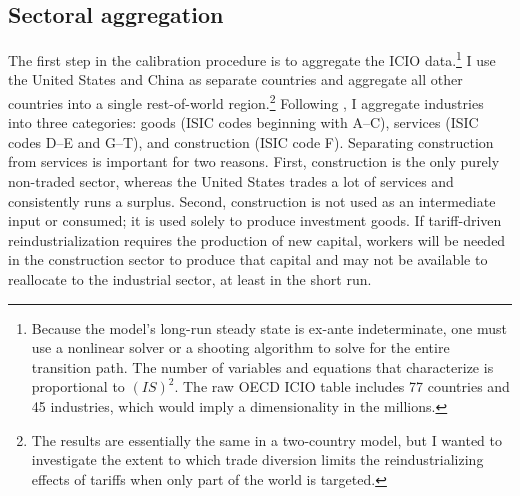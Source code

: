 \documentclass[12pt]{article}
\begin{document}
\subsection{Sectoral aggregation}
The first step in the calibration procedure is to aggregate the ICIO data.\footnote{Because the model's long-run steady state is ex-ante indeterminate, one must use a nonlinear solver or a shooting algorithm to solve for the entire transition path. The number of variables and equations that characterize is proportional to $(IS)^2$. The raw OECD ICIO table includes 77 countries and 45 industries, which would imply a dimensionality in the millions.} I use the United States and China as separate countries and aggregate all other countries into a single rest-of-world region.\footnote{The results are essentially the same in a two-country model, but I wanted to investigate the extent to which trade diversion limits the reindustrializing effects of tariffs when only part of the world is targeted.} Following \citet{KRS_2018}, I aggregate industries into three categories: goods (ISIC codes beginning with A--C), services (ISIC codes D--E and G--T), and construction (ISIC code F). Separating construction from services is important for two reasons. First, construction is the only purely non-traded sector, whereas the United States trades a lot of services and consistently runs a surplus. Second, construction is not used as an intermediate input or consumed; it is used solely to produce investment goods. If tariff-driven reindustrialization requires the production of new capital, workers will be needed in the construction sector to produce that capital and may not be available to reallocate to the industrial sector, at least in the short run.
\end{document}
